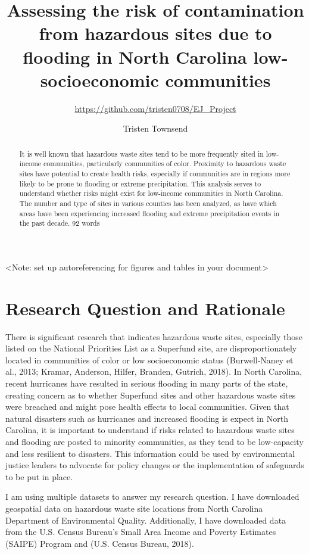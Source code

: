 \documentclass[12pt,]{article}
\title{Assessing the risk of contamination from hazardous sites due to flooding
in North Carolina low-socioeconomic communities}
\subtitle{\url{https://github.com/tristen0708/EJ_Project}}
\author{Tristen Townsend}
\date{}
\begin{document}
\maketitle
\begin{abstract}
It is well known that hazardous waste sites tend to be more frequently
sited in low-income communities, particularly communities of color.
Proximity to hazardous waste sites have potential to create health
risks, especially if communities are in regions more likely to be prone
to flooding or extreme precipitation. This analysis serves to understand
whether risks might exist for low-income communities in North Carolina.
The number and type of sites in various counties has been analyzed, as
have which areas have been experiencing increased flooding and extreme
precipitation events in the past decade. 92 words
\end{abstract}

\newpage

\tableofcontents  \newpage
\listoftables  \newpage
\listoffigures  \newpage

\textless{}Note: set up autoreferencing for figures and tables in your
document\textgreater{}

\section{Research Question and
Rationale}\label{research-question-and-rationale}

There is significant research that indicates hazardous waste sites,
especially those listed on the National Priorities List as a Superfund
site, are disproportionately located in communities of color or low
socioeconomic status (Burwell-Naney et al., 2013; Kramar, Anderson,
Hilfer, Branden, Gutrich, 2018). In North Carolina, recent hurricanes
have resulted in serious flooding in many parts of the state, creating
concern as to whether Superfund sites and other hazardous waste sites
were breached and might pose health effects to local communities. Given
that natural disasters such as hurricanes and increased flooding is
expect in North Carolina, it is important to understand if risks related
to hazardous waste sites and flooding are posted to minority
communities, as they tend to be low-capacity and less resilient to
disasters. This information could be used by environmental justice
leaders to advocate for policy changes or the implementation of
safeguards to be put in place.

I am using multiple datasets to answer my research question. I have
downloaded geospatial data on hazardous waste site locations from North
Carolina Department of Environmental Quality. Additionally, I have
downloaded data from the U.S. Census Bureau's Small Area Income and
Poverty Estimates (SAIPE) Program and (U.S. Census Bureau, 2018).
\end{document}
